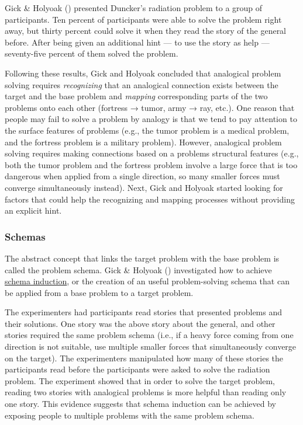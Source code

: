 \documentclass[
]{krantz}
\begin{document}
Gick \& Holyoak () presented Duncker's radiation problem to a group of participants. Ten percent of participants were able to solve the problem right away, but thirty percent could solve it when they read the story of the general before. After being given an additional hint --- to use the story as help --- seventy-five percent of them solved the problem.

Following these results, Gick and Holyoak concluded that analogical problem solving requires
\emph{recognizing} that an analogical connection exists between the target and the base problem and \emph{mapping} corresponding parts of the two problems onto each other (fortress → tumor, army → ray, etc.). One reason that people may fail to solve a problem by analogy is that we tend to pay attention to the surface features of problems (e.g., the tumor problem is a medical problem, and the fortress problem is a military problem). However, analogical problem solving requires making connections based on a problems structural features (e.g., both the tumor problem and the fortress problem involve a large force that is too dangerous when applied from a single direction, so many smaller forces must converge simultaneously instead). Next, Gick and Holyoak started looking for factors that could help the recognizing and mapping processes without providing an explicit hint.

\subsubsection*{Schemas}\label{schemas}


The abstract concept that links the target problem with the base problem is called the problem schema. Gick \& Holyoak () investigated how to achieve \hyperref[schema-induction]{schema induction}, or the creation of an useful problem-solving schema that can be applied from a base problem to a target problem.

The experimenters had participants read stories that presented problems and their solutions. One story was the above story about the general, and other stories required the same problem schema (i.e., if a heavy force coming from one direction is not suitable, use multiple smaller forces that simultaneously converge on the target). The experimenters manipulated how many of these stories the participants read before the participants were asked to solve the radiation problem. The experiment showed that in order to solve the target problem, reading two stories with analogical problems is more helpful than reading only one story. This evidence suggests that schema induction can be achieved by exposing people to multiple problems with the same problem schema.
\end{document}
